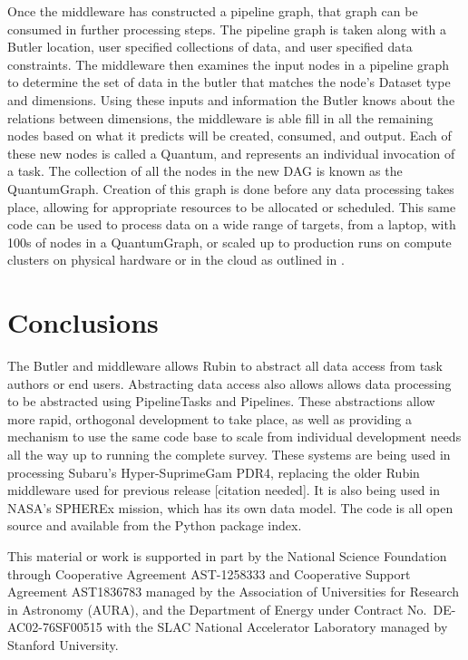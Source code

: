 \documentclass[11pt,twoside]{article}
\begin{document}
Once the middleware has constructed a pipeline graph, that graph can be consumed in further processing steps. The pipeline graph is taken along with a Butler location, user specified collections of data, and user specified data constraints.  The middleware then examines the input nodes in a pipeline graph to determine the set of data in the butler that matches the node's Dataset type and dimensions. Using these inputs and information the Butler knows about the relations between dimensions, the middleware is able fill in all the remaining nodes based on what it predicts will be created, consumed, and output. Each of these new nodes is called a Quantum, and represents an individual invocation of a task. The collection of all the nodes in the new DAG is known as the QuantumGraph. Creation of this graph is done before any data processing takes place, allowing for appropriate resources to be allocated or scheduled. This same code can be used to process data on a wide range of targets, from a laptop, with 100s of nodes in a QuantumGraph, or scaled up to production runs on compute clusters on physical hardware or in the cloud as outlined in \citet{P52_adassxxxii}.

\section{Conclusions}
The Butler and middleware allows Rubin to abstract all data access from task authors or end users. Abstracting data access also allows allows data processing to be abstracted using PipelineTasks and Pipelines. These abstractions allow more rapid, orthogonal development to take place, as well as providing a mechanism to use the same code base to scale from individual development needs all the way up to running the complete survey. These systems are being used in processing Subaru's Hyper-SuprimeGam PDR4, replacing the older Rubin middleware used for previous release [citation needed]. It is also being used in NASA's SPHEREx mission, which has its own data model. The code is all open source and available from the Python package index.

\acknowledgments This material or work is supported in part by the National Science Foundation through Cooperative Agreement AST-1258333 and Cooperative Support Agreement AST1836783 managed by the Association of Universities for Research in Astronomy (AURA), and the Department of Energy under Contract No.\ DE-AC02-76SF00515 with the SLAC National Accelerator Laboratory managed by Stanford University.


\end{document}
